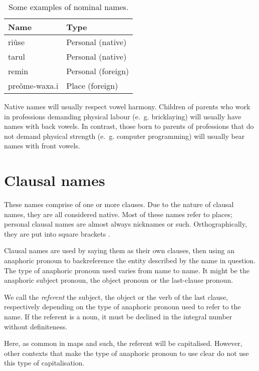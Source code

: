 \documentclass{book}
\begin{document}
\begin{table}[h]
    \centering
    \caption{Some examples of nominal names.}
    \label{table:names1}
    \begin{tabular}{|>{\kardinal}l|l|}
        \hline
        \textnormal{Name} & Type \\
        \hline
        \bs{}ri\^use & Personal (native) \\
        \bs{}tarul & Personal (native) \\
        \bs{}remin & Personal (foreign) \\
        pre\^ome-\bs{}waxa.i & Place (foreign) \\
        \hline
    \end{tabular}
\end{table}

Native names will usually respect vowel harmony. Children of parents who work in professions demanding physical labour (e.~g. bricklaying) will usually have names with back vowels. In contrast, those born to parents of professions that do not demand physical strength (e.~g. computer programming) will usually bear names with front vowels.

\section{Clausal names}

These names comprise of one or more clauses. Due to the nature of clausal names, they are all considered native. Most of these names refer to places; personal clausal names are almost always nicknames or such. Orthographically, they are put into square brackets \hortho{[]}.

Clausal names are used by saying them as their own clauses, then using an anaphoric pronoun to backreference the entity described by the name in question. The type of anaphoric pronoun used varies from name to name. It might be the anaphoric subject pronoun, the object pronoun or the last-clause pronoun.

We call the \emph{referent} the subject, the object or the verb of the last clause, respectively depending on the type of anaphoric pronoun used to refer to the name. If the referent is a noun, it must be declined in the integral number without definiteness.

Here, as common in maps and such, the referent will be capitalised. However, other contexts that make the type of anaphoric pronoun to use clear do not use this type of capitalisation.
\end{document}
